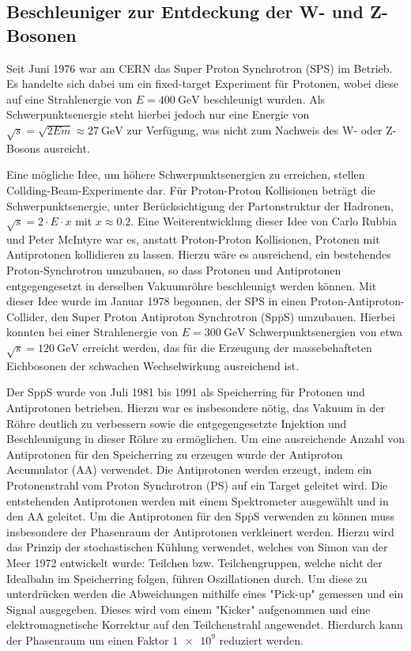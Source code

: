 \subsection{Beschleuniger zur Entdeckung der W- und Z-Bosonen}
Seit Juni 1976 war am CERN das Super Proton Synchrotron (SPS) im Betrieb.
Es handelte sich dabei um ein fixed-target Experiment für Protonen, wobei diese auf eine Strahlenergie von $E = \SI{400}{\giga\electronvolt}$ beschleunigt wurden.
Als Schwerpunktsenergie steht hierbei jedoch nur eine Energie von $\sqrt{s} = \sqrt{2 E m} \approx \SI{27}{\giga\electronvolt}$ zur Verfügung, was nicht zum Nachweis des W- oder Z-Bosons ausreicht.

Eine mögliche Idee, um höhere Schwerpunktsenergien zu erreichen, stellen Collding-Beam-Experimente dar.
Für Proton-Proton Kollisionen beträgt die Schwerpunktsenergie, unter Berücksichtigung der Partonstruktur der Hadronen, $\sqrt{s} = 2 \cdot E \cdot x$ mit $x \approx \num{0.2}$.
Eine Weiterentwicklung dieser Idee von Carlo Rubbia und Peter McIntyre war es, anstatt Proton-Proton Kollisionen, Protonen mit Antiprotonen kollidieren zu lassen.
Hierzu wäre es ausreichend, ein bestehendes Proton-Synchrotron umzubauen, so dass Protonen und Antiprotonen entgegengesetzt in derselben Vakuumröhre beschleunigt werden können.
Mit dieser Idee wurde im Januar 1978 begonnen, der SPS in einen Proton-Antiproton-Collider, den Super Proton Antiproton Synchrotron (Sp$\overline{\text{p}}$S) umzubauen.
Hierbei konnten bei einer Strahlenergie von $E = \SI{300}{\giga\electronvolt}$ Schwerpunktsenergien von etwa $\sqrt{s} = \SI{120}{\giga\electronvolt}$ erreicht werden, das für die Erzeugung der massebehafteten Eichbosonen der schwachen Wechselwirkung ausreichend ist.

Der Sp$\overline{\text{p}}$S wurde von Juli 1981 bis 1991 als Speicherring für Protonen und Antiprotonen betrieben.
Hierzu war es insbesondere nötig, das Vakuum in der Röhre deutlich zu verbessern sowie die entgegengesetzte Injektion und Beschleunigung in dieser Röhre zu ermöglichen.
Um eine ausreichende Anzahl von Antiprotonen für den Speicherring zu erzeugen wurde der Antiproton Accumulator (AA) verwendet.
Die Antiprotonen werden erzeugt, indem ein Protonenstrahl vom Proton Synchrotron (PS) auf ein Target geleitet wird.
Die entstehenden Antiprotonen werden mit einem Spektrometer ausgewählt und in den AA geleitet.
Um die Antiprotonen für den Sp$\overline{\text{p}}$S verwenden zu können muss insbesondere der Phasenraum der Antiprotonen verkleinert werden.
Hierzu wird das Prinzip der stochastischen Kühlung verwendet, welches von Simon van der Meer 1972 entwickelt wurde:
Teilchen bzw. Teilchengruppen, welche nicht der Idealbahn im Speicherring folgen, führen Oszillationen durch.
Um diese zu unterdrücken werden die Abweichungen mithilfe eines "Pick-up" gemessen und ein Signal ausgegeben.
Dieses wird vom einem "Kicker" aufgenommen und eine elektromagnetische Korrektur auf den Teilchenstrahl angewendet.
Hierdurch kann der Phasenraum um einen Faktor $\num{1e9}$ reduziert werden.

